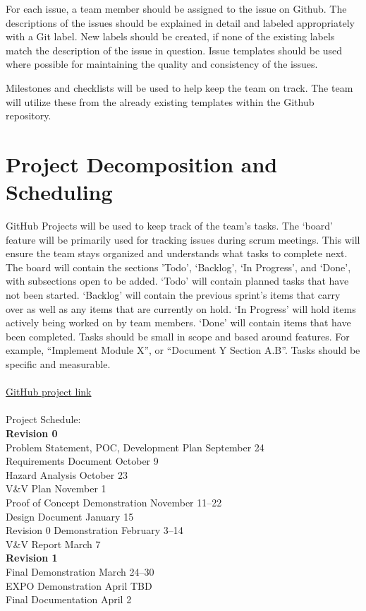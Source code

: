 \documentclass{article}
\begin{document}
For each issue, a team member should be assigned to the issue on Github. The descriptions
of the issues should be explained in detail and labeled appropriately with a Git label. New labels
should be created, if none of the existing labels match the description of the issue in question.
Issue templates should be used where possible for maintaining the quality and consistency of the
issues.\newline

Milestones and checklists will be used to help keep the team on track. The team will
utilize these from the already existing templates within the Github repository.

\section{Project Decomposition and Scheduling}

GitHub Projects will be used to keep track of the team’s tasks. The ‘board’ feature will be primarily used for tracking issues during scrum meetings. This will ensure the team stays organized and understands what tasks to complete next.
The board will contain the sections ’Todo’, ‘Backlog’, ‘In Progress’, and ‘Done’, with subsections open to be added. ‘Todo’ will contain planned tasks that have not been started. ‘Backlog’ will contain the previous sprint’s items that carry over as well as any items that are currently on hold. ‘In Progress’ will hold items actively being worked on by team members. ‘Done’ will contain items that have been completed.
Tasks should be small in scope and based around features. For example, “Implement Module X”, or “Document Y Section A.B”. Tasks should be specific and measurable.
\\\\
\href{https://github.com/users/saltA-saurus/projects/5}{GitHub project link}
\\\\
Project Schedule:\\
\indent \textbf{Revision 0}\\
\indent Problem Statement, POC, Development Plan \hfill September 24\\
\indent Requirements Document \hfill October 9\\
\indent Hazard Analysis \hfill October 23\\
\indent V\&V Plan \hfill November 1\\
\indent Proof of Concept Demonstration \hfill November 11--22\\
\indent Design Document \hfill January 15\\
\indent Revision 0 Demonstration \hfill February 3--14\\
\indent V\&V Report \hfill March 7\\
\indent \textbf{Revision 1}\\
\indent Final Demonstration \hfill March 24--30\\
\indent EXPO Demonstration \hfill April TBD\\
\indent Final Documentation \hfill April 2\\
\end{document}
